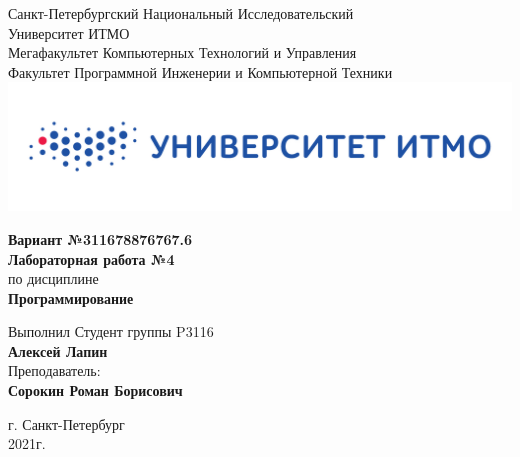 \documentclass[12pt,onecolumn]{article}
\begin{document}
\setcounter{tocdepth}{4}
\begin{center}
    Санкт-Петербургский Национальный Исследовательский\\ 
    Университет ИТМО\\
    Мегафакультет Компьютерных Технологий и Управления\\
    Факультет Программной Инженерии и Компьютерной Техники \\
    \includegraphics[scale=0.3]{itm.jpg} %
\end{center}
\vspace{1cm}


\begin{center}
    \large \textbf{Вариант №311678876767.6}\\
    \textbf{Лабораторная работа №4}\\
    по дисциплине\\
    \textbf{Программирование}
\end{center}

\vspace{2cm}

\begin{flushright}
  Выполнил Студент  группы P3116\\
  \textbf{Алексей Лапин}\\
  Преподаватель: \\
  \textbf{Сорокин Роман Борисович}\\
\end{flushright}

\vspace{10cm}
\begin{center}
    г. Санкт-Петербург\\
    2021г.
\end{center}
\newpage
\tableofcontents
\newpage
\end{document}
